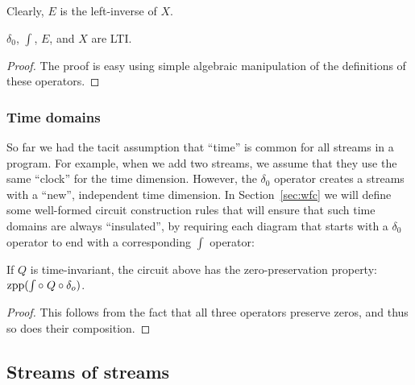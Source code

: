 Clearly, $E$ is the left-inverse of $X$.

\begin{proposition}
$\delta_0$, $\int$, $E$, and $X$ are LTI.
\end{proposition}
\begin{proof}
The proof is easy using simple algebraic manipulation of the definitions of these operators.
\end{proof}

\subsubsection{Time domains}\label{sec:time-domains}

So far we had the tacit assumption that ``time'' is common for all
streams in a program.  For example, when we add two streams, 
we assume that they use the same ``clock'' for the time dimension.
However, the $\delta_0$ operator creates a streams with a ``new'', independent time
dimension.  In Section~\ref{sec:wfc} we will define some well-formed circuit
construction rules that will ensure that such time domains are always ``insulated'', 
by requiring each diagram that starts with a $\delta_0$ operator
to end with a corresponding $\int$ operator:

\begin{center}
\end{center}


\begin{proposition}
If $Q$ is time-invariant, the circuit above has the zero-preservation
property: $\mbox{zpp}(\int \circ\; Q \circ \delta_o)$.
\end{proposition}
\begin{proof}
  This follows from the fact that all three operators preserve zeros, and thus so 
  does their composition.
\end{proof}

\subsection{Streams of streams}\label{sec:nested}

